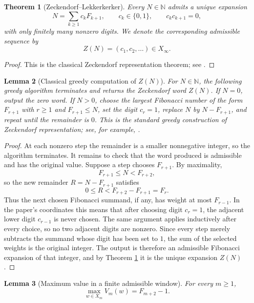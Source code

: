 \documentclass[12pt,a4paper]{article}
\theoremstyle{plain}
\newtheorem{theorem}{Theorem}[section]
\newtheorem{lemma}[theorem]{Lemma}
\theoremstyle{definition}
\numberwithin{equation}{section}
\newcommand{\NN}{\mathbb{N}}
\begin{document}
\begin{theorem}[Zeckendorf--Lekkerkerker]\label{thm:zeckendorf-unique}
Every \(N\in\NN\) admits a unique expansion
\[
N=\sum_{k\ge 1} c_k F_{k+1},
\qquad
c_k\in\{0,1\},\qquad c_kc_{k+1}=0,
\]
with only finitely many nonzero digits. We denote the corresponding admissible sequence by
\[
Z(N)=(c_1,c_2,\dots)\in X_\infty.
\]
\end{theorem}

\begin{proof}
This is the classical Zeckendorf representation theorem; see \cite{Lekkerkerker1952,Zeckendorf1972}.
\end{proof}

\begin{lemma}[Classical greedy computation of \(Z(N)\)]\label{lem:greedy-zeckendorf-computation}
For \(N\in\NN\), the following greedy algorithm terminates and returns the Zeckendorf word \(Z(N)\). If \(N=0\), output the zero word. If \(N>0\), choose the largest Fibonacci number of the form \(F_{r+1}\) with \(r\ge 1\) and \(F_{r+1}\le N\), set the digit \(c_r=1\), replace \(N\) by \(N-F_{r+1}\), and repeat until the remainder is \(0\). This is the standard greedy construction of Zeckendorf representation; see, for example, \cite{Lekkerkerker1952,Zeckendorf1972,Koshy2018}.
\end{lemma}

\begin{proof}
At each nonzero step the remainder is a smaller nonnegative integer, so the algorithm terminates. It remains to check that the word produced is admissible and has the original value. Suppose a step chooses \(F_{r+1}\). By maximality,
\[
F_{r+1}\le N<F_{r+2},
\]
so the new remainder \(R=N-F_{r+1}\) satisfies
\[
0\le R<F_{r+2}-F_{r+1}=F_r.
\]
Thus the next chosen Fibonacci summand, if any, has weight at most \(F_{r-1}\). In the paper's coordinates this means that after choosing digit \(c_r=1\), the adjacent lower digit \(c_{r-1}\) is never chosen. The same argument applies inductively after every choice, so no two adjacent digits are nonzero. Since every step merely subtracts the summand whose digit has been set to \(1\), the sum of the selected weights is the original integer. The output is therefore an admissible Fibonacci expansion of that integer, and by Theorem \ref{thm:zeckendorf-unique} it is the unique expansion \(Z(N)\).
\end{proof}

\begin{lemma}[Maximum value in a finite admissible window]\label{lem:finite-window-max}
For every \(m\ge 1\),
\[
\max_{w\in X_m} V_m(w)=F_{m+2}-1.
\]
\end{lemma}
\end{document}
